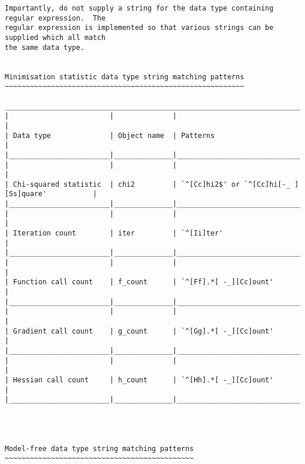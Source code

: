 {\begin{verbatim}
Importantly, do not supply a string for the data type containing regular expression.  The
regular expression is implemented so that various strings can be supplied which all match
the same data type.


Minimisation statistic data type string matching patterns
~~~~~~~~~~~~~~~~~~~~~~~~~~~~~~~~~~~~~~~~~~~~~~~~~~~~~~~~~

____________________________________________________________________________________________
|                        |              |                                                  |
| Data type              | Object name  | Patterns                                         |
|________________________|______________|__________________________________________________|
|                        |              |                                                  |
| Chi-squared statistic  | chi2         | `^[Cc]hi2$' or `^[Cc]hi[-_ ][Ss]quare'           |
|________________________|______________|__________________________________________________|
|                        |              |                                                  |
| Iteration count        | iter         | `^[Ii]ter'                                       |
|________________________|______________|__________________________________________________|
|                        |              |                                                  |
| Function call count    | f_count      | `^[Ff].*[ -_][Cc]ount'                           |
|________________________|______________|__________________________________________________|
|                        |              |                                                  |
| Gradient call count    | g_count      | `^[Gg].*[ -_][Cc]ount'                           |
|________________________|______________|__________________________________________________|
|                        |              |                                                  |
| Hessian call count     | h_count      | `^[Hh].*[ -_][Cc]ount'                           |
|________________________|______________|__________________________________________________|




Model-free data type string matching patterns
~~~~~~~~~~~~~~~~~~~~~~~~~~~~~~~~~~~~~~~~~~~~~


\end{verbatim}}
